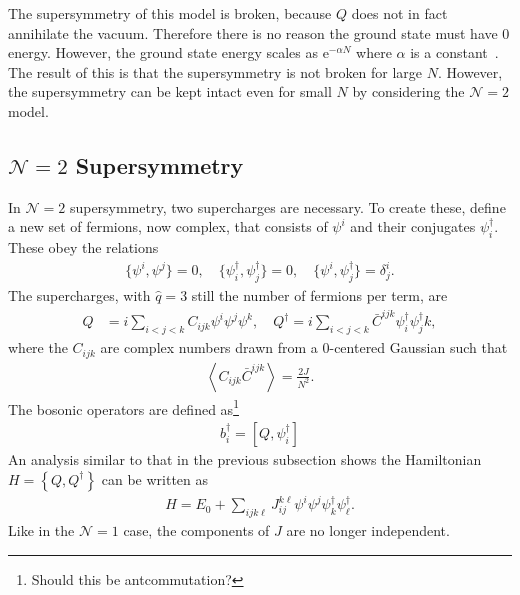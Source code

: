 \documentclass[12pt]{article} %
\renewcommand{\cal}{\mathcal}
\newcommand{\ex}[1]{\left\langle #1 \right\rangle}
\newcommand{\e}{\text{e}}
\renewcommand{\l}{\ell}
\newcommand{\comm}[2]{\left[#1,#2\right]}
\newcommand{\acom}[2]{\left\{#1,#2\right\}}
\begin{document}
The supersymmetry of this model is broken, because $Q$ does not in fact annihilate the vacuum. Therefore there is no reason the ground state must have 0 energy. However, the ground state energy scales as $\e^{-\alpha N}$ where $\alpha$ is a constant~\cite{mald16}. The result of this is that the supersymmetry is not broken for large $N$. However, the supersymmetry can be kept intact even for small $N$ by considering the $\cal N=2$ model.

\subsection{$\cal{N}=2$ Supersymmetry}\emph{} \label{sub:N2susy}

In $\cal N=2$ supersymmetry, two supercharges are necessary. To create these, define a new set of fermions, now complex, that consists of $\psi^i$ and their conjugates $\psi^\dag_i$. These obey the relations 
\begin{align}
\{\psi^i,\psi^j\} = 0, \quad \{\psi^\dag_i,\psi^\dag_j\} = 0, \quad
	\{\psi^i,\psi^\dag_j\} = \delta_j^i. \label{eqn:N2_ant}
\end{align}
The supercharges, with $\hat{q}=3$ still the number of fermions per term, are
\begin{align}
Q &= i\sum_{i<j<k}C_{ijk}\psi^i\psi^j\psi^k,\quad
Q^\dag = i\sum_{i<j<k}\bar C^{ijk}\psi^\dag_i\psi^\dag_jk,
	\label{eqn:N2charge}
\end{align}
where the $C_{ijk}$ are complex numbers drawn from a 0-centered Gaussian such that
\begin{align}
\ex{C_{ijk}\bar C^{ijk}} = \frac{2J}{N^2}.
\end{align} 
The bosonic operators are defined as\footnote{Should this be antcommutation?}
\begin{align}
b^\dag_i = \comm{Q}{\psi^\dag_i}
\end{align}
An analysis similar to that in the previous subsection shows the Hamiltonian $H = \acom{Q}{Q^\dag}$ can be written as
\begin{align}
H = E_0 + \sum_{ijk\l}J_{ij}^{k\l}\psi^i\psi^j\psi^\dag_k\psi^\dag_\l.
\end{align}
Like in the $\cal N=1$ case, the components of $J$ are no longer independent.
\end{document}
